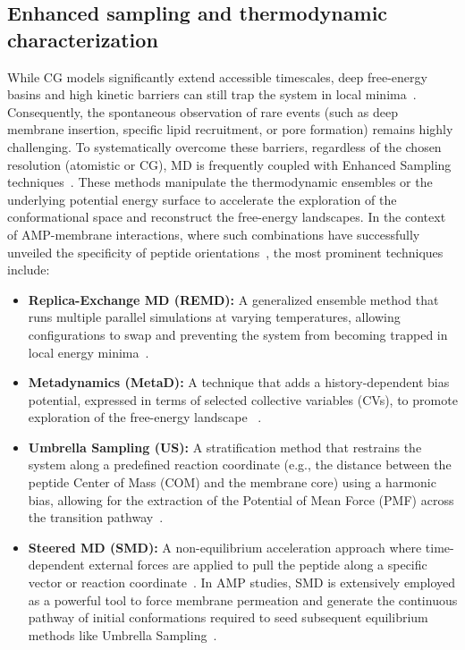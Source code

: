 \subsection{Enhanced sampling and thermodynamic characterization}

While CG models significantly extend accessible timescales, deep free-energy basins and high kinetic barriers can still trap the system in local minima~\cite{limitaciones_md}. Consequently, the spontaneous observation of rare events (such as deep membrane insertion, specific lipid recruitment, or pore formation) remains highly challenging. To systematically overcome these barriers, regardless of the chosen resolution (atomistic or CG), MD is frequently coupled with Enhanced Sampling techniques~\cite{limitation_martini_1,limitation_martini_2,steered_md_1,steered_md_2,Richardson2024}. These methods manipulate the thermodynamic ensembles or the underlying potential energy surface to accelerate the exploration of the conformational space and reconstruct the free-energy landscapes. In the context of AMP-membrane interactions, where such combinations have successfully unveiled the specificity of peptide orientations~\cite{samson_umbrella_sampling}, the most prominent techniques include:

\begin{itemize}
    \item \textbf{Replica-Exchange MD (REMD):} A generalized ensemble method that runs multiple parallel simulations at varying temperatures, allowing configurations to swap and preventing the system from becoming trapped in local energy minima~\cite{replica}.
    \item \textbf{Metadynamics (MetaD):} A technique that adds a history-dependent bias potential, expressed in terms of selected collective variables (CVs), to promote exploration of the free-energy landscape  ~\cite{Laio2002,plumed,opes,Barducci2008}.
    \item \textbf{Umbrella Sampling (US):} A stratification method that restrains the system along a predefined reaction coordinate (e.g., the distance between the peptide Center of Mass (COM) and the membrane core) using a harmonic bias, allowing for the extraction of the Potential of Mean Force (PMF) across the transition pathway~\cite{umbrella_sampling_origen,umbrella_sampling}.
    \item \textbf{Steered MD (SMD):} A non-equilibrium acceleration approach where time-dependent external forces are applied to pull the peptide along a specific vector or reaction coordinate~\cite{steered_md}. In AMP studies, SMD is extensively employed as a powerful tool to force membrane permeation and generate the continuous pathway of initial conformations required to seed subsequent equilibrium methods like Umbrella Sampling~\cite{steered_md_2,steered_md_1}.
\end{itemize}

